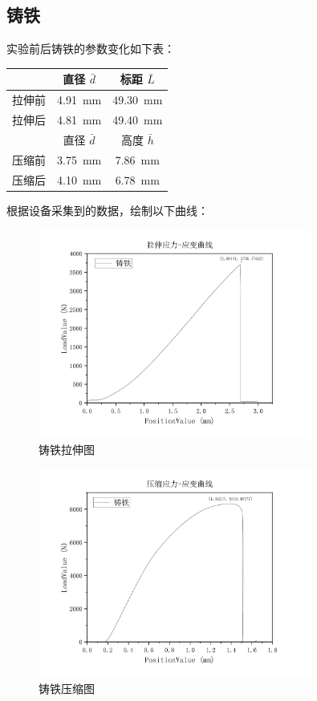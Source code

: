 \documentclass[a4paper,utf8]{article}
\begin{document}
    \subsection{铸铁}
    实验前后铸铁的参数变化如下表：\par
        \begin{table}[!ht]
            \centering\begin{tabular}{c c c}\hline
                \ & 直径 $\bar{d}$ & 标距 $\bar{L}$ \\ \hline
                拉伸前 & \SI{4.91}{\mm} & \SI{49.30}{\mm} \\ 
                拉伸后 & \SI{4.81}{\mm} & \SI{49.40}{\mm} \\ \hline
                \ & 直径 $\bar{d}$ & 高度 $\bar{h}$ \\ \hline
                压缩前 & \SI{3.75}{\mm} & \SI{7.86}{\mm} \\ 
                压缩后 & \SI{4.10}{\mm} & \SI{6.78}{\mm} \\ \hline
            \end{tabular}
        \end{table}\par
        根据设备采集到的数据，绘制以下曲线：\newpage
        \begin{figure}[!ht]
            \includegraphics[width=0.8\textwidth]{result/fig2a.pdf}
            \caption{铸铁拉伸图}
        \end{figure}
        \begin{figure}[!ht]
            \includegraphics[width=0.8\textwidth]{result/fig2b.pdf}
            \caption{铸铁压缩图}
        \end{figure}
        
\end{document}
